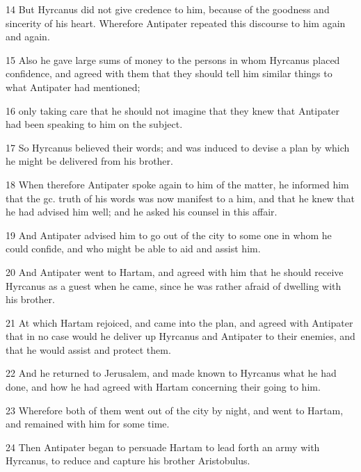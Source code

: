 \par 14 But Hyrcanus did not give credence to him, because of the goodness and sincerity of his heart. Wherefore Antipater repeated this discourse to him again and again. 

\par 15 Also he gave large sums of money to the persons in whom Hyrcanus placed confidence, and agreed with them that they should tell him similar things to what Antipater had mentioned; 

\par 16 only taking care that he should not imagine that they knew that Antipater had been speaking to him on the subject. 

\par 17 So Hyrcanus believed their words; and was induced to devise a plan by which he might be delivered from his brother. 

\par 18 When therefore Antipater spoke again to him of the matter, he informed him that the gc. truth of his words was now manifest to a him, and that he knew that he had advised him well; and he asked his counsel in this affair. 

\par 19 And Antipater advised him to go out of the city to some one in whom he could confide, and who might be able to aid and assist him. 

\par 20 And Antipater went to Hartam, and agreed with him that he should receive Hyrcanus as a guest when he came, since he was rather afraid of dwelling with his brother. 

\par 21 At which Hartam rejoiced, and came into the plan, and agreed with Antipater that in no case would he deliver up Hyrcanus and Antipater to their enemies, and that he would assist and protect them. 

\par 22 And he returned to Jerusalem, and made known to Hyrcanus what he had done, and how he had agreed with Hartam concerning their going to him. 

\par 23 Wherefore both of them went out of the city by night, and went to Hartam, and remained with him for some time. 

\par 24 Then Antipater began to persuade Hartam to lead forth an army with Hyrcanus, to reduce and capture his brother Aristobulus. 

